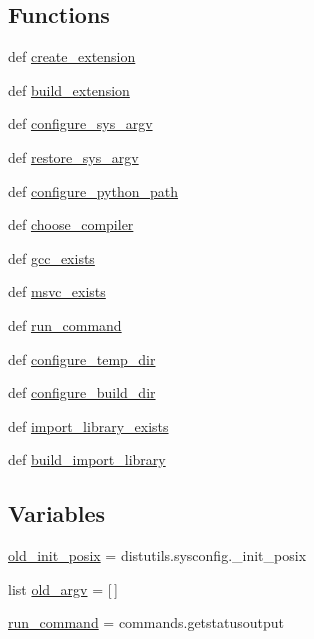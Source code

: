 \subsection*{Functions}
\begin{DoxyCompactItemize}
\item 
def \hyperlink{namespacescipy_1_1weave_1_1build__tools_a8229bd8f1d2c31d58ff05b5e9c4a451f}{create\+\_\+extension}
\item 
def \hyperlink{namespacescipy_1_1weave_1_1build__tools_a7f26b87595b289576e414a4b29c2a308}{build\+\_\+extension}
\item 
def \hyperlink{namespacescipy_1_1weave_1_1build__tools_a1099ae72d4b28d2c40b2ed87c9d07eb5}{configure\+\_\+sys\+\_\+argv}
\item 
def \hyperlink{namespacescipy_1_1weave_1_1build__tools_a787690fd7764771ad17e801605c012c4}{restore\+\_\+sys\+\_\+argv}
\item 
def \hyperlink{namespacescipy_1_1weave_1_1build__tools_a451e6f0415ed5faa7b7aa070852cb3ca}{configure\+\_\+python\+\_\+path}
\item 
def \hyperlink{namespacescipy_1_1weave_1_1build__tools_aa8275c23fdb87dc0b42fa5374baf361a}{choose\+\_\+compiler}
\item 
def \hyperlink{namespacescipy_1_1weave_1_1build__tools_a8b56827a80ba8ed79821231e69dce497}{gcc\+\_\+exists}
\item 
def \hyperlink{namespacescipy_1_1weave_1_1build__tools_a599bf035738eebb9dcc3b83902e346c1}{msvc\+\_\+exists}
\item 
def \hyperlink{namespacescipy_1_1weave_1_1build__tools_adfd9596a2ff4edc55a62dae7c030540b}{run\+\_\+command}
\item 
def \hyperlink{namespacescipy_1_1weave_1_1build__tools_a861ffa191b510ff8b94f82d1bc57e547}{configure\+\_\+temp\+\_\+dir}
\item 
def \hyperlink{namespacescipy_1_1weave_1_1build__tools_aeb1a20fc11310d4534a89c51d2c5b400}{configure\+\_\+build\+\_\+dir}
\item 
def \hyperlink{namespacescipy_1_1weave_1_1build__tools_aac342eb93fb94587f966b2f8b4fcaf60}{import\+\_\+library\+\_\+exists}
\item 
def \hyperlink{namespacescipy_1_1weave_1_1build__tools_a6a65c1c7c44bdad69c2c2a35993c304c}{build\+\_\+import\+\_\+library}
\end{DoxyCompactItemize}
\subsection*{Variables}
\begin{DoxyCompactItemize}
\item 
\hyperlink{namespacescipy_1_1weave_1_1build__tools_a6f8298fe5226e3c1a6b0a91b8a37c11e}{old\+\_\+init\+\_\+posix} = distutils.\+sysconfig.\+\_\+init\+\_\+posix
\item 
list \hyperlink{namespacescipy_1_1weave_1_1build__tools_aa46171df8959450fc5ea7795eae4ebfd}{old\+\_\+argv} = \mbox{[}$\,$\mbox{]}
\item 
\hyperlink{namespacescipy_1_1weave_1_1build__tools_af42c96dca957b7a6f3fd70d224c64b72}{run\+\_\+command} = commands.\+getstatusoutput
\end{DoxyCompactItemize}



